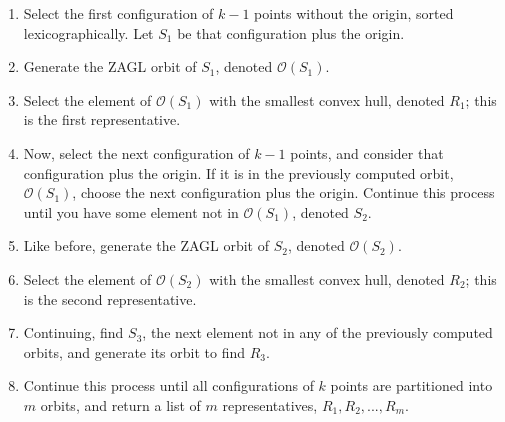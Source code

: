 \documentclass[12pt]{amsart}
\theoremstyle{plain}
\DeclareMathOperator{\Reps}{reps}
\begin{document}

\begin{enumerate}
\item{} Select the first configuration of $k-1$ points without the origin, sorted lexicographically. Let $S_1$ be that configuration plus the origin.
\item{} Generate the ZAGL orbit of $S_1$, denoted $\mathscr{O}(S_1)$.
\item{} Select the element of $\mathscr{O}(S_1)$ with the smallest convex hull, denoted $R_1$; this is the first representative.
\item{} Now, select the next configuration of $k-1$ points, and consider that configuration plus the origin. If it is in the previously computed orbit, $\mathscr{O}(S_1)$, choose the next configuration plus the origin. Continue this process until you have some element not in $\mathscr{O}(S_1)$, denoted $S_2$.
\item{} Like before, generate the ZAGL orbit of $S_2$, denoted $\mathscr{O}(S_2)$.
\item{} Select the element of $\mathscr{O}(S_2)$ with the smallest convex hull, denoted $R_2$; this is the second representative.
\item{} Continuing, find $S_3$, the next element not in any of the previously computed orbits, and generate its orbit to find $R_3$.
\item{} Continue this process until all configurations of $k$ points are partitioned into $m$ orbits, and return a list of $m$ representatives, $R_1, R_2, ..., R_m$.
\end{enumerate}
\end{document}
